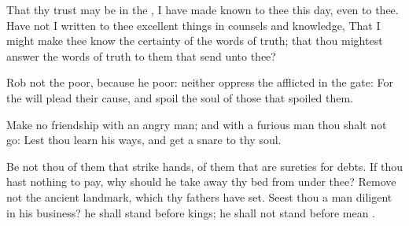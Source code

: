 {That thy
trust may be in the
{}, I have made
known to thee this
day, even to thee.
Have not I
written to
thee excellent
things in
counsels and
knowledge,
That I might make thee
know the
certainty of the
words of
truth; that thou mightest
answer the
words of
truth to them that
send unto thee?
\par }{\PP {}Rob not the
poor, because he
{}
poor: neither
oppress the
afflicted in the
gate:
For the
{} will
plead their
cause, and
spoil the
soul of those that
spoiled them.
\par }{\PP {}Make no
friendship with an
angry
man; and with a
furious
man thou shalt not
go:
Lest thou
learn his
ways, and
get a
snare to thy
soul.
\par }{\PP {}Be not thou
{} of them that
strike
hands,
{} of them that are
sureties for
debts.
If thou hast nothing to
pay, why should he take
away thy
bed from under thee?
Remove not the
ancient
landmark, which thy
fathers have
set.
Seest thou a
man
diligent in his
business? he shall
stand
before
kings; he shall not
stand
before
mean
{}.

}
